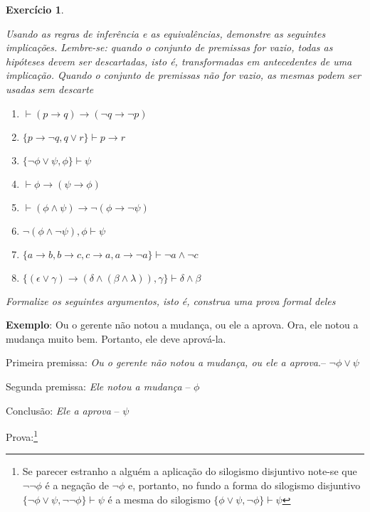 \documentclass[a4paper,10pt]{article}
\newtheorem{exrcc}{Exercício}[subsection] %
\begin{document}
\begin{exrcc}
 \label{demformal}


Usando as regras de inferência e as equivalências, demonstre as seguintes
implicações. Lembre-se: quando o conjunto de premissas for vazio, todas as hipóteses
devem ser descartadas, isto é, transformadas em antecedentes de uma implicação. Quando
o conjunto de premissas não for vazio, as mesmas podem ser usadas sem descarte

\begin{enumerate}
\setlength{\itemsep}{0pt} 
\item $\vdash(p\rightarrow{}q)\rightarrow(\neg{}q\rightarrow\neg{}p)$
 \item $\{p\rightarrow\neg{}q,{}q\vee{}r\}\vdash{}p\rightarrow{}r$
 \item $\{\neg\phi\vee\psi, \phi\}\vdash{}\psi$
 \item $\vdash\phi\rightarrow(\psi\rightarrow\phi)$
 \item $\vdash(\phi\wedge\psi)\rightarrow\neg(\phi\rightarrow\neg\psi)$
 \item $\neg(\phi\wedge\neg\psi), \phi\vdash\psi$
 \item $\{a\rightarrow{}b, b\rightarrow{}c, c\rightarrow{}a,
a\rightarrow{}\neg{}a\}\vdash\neg{}a\wedge\neg{}c$
\item $\{(\epsilon\vee\gamma)\rightarrow(\delta\wedge(\beta\wedge\lambda)),
\gamma\}\vdash\delta\wedge\beta$
\end{enumerate}
\end{exrcc}




\emph{Formalize os seguintes argumentos, isto é, construa uma prova formal deles}

\textbf{Exemplo}: Ou o gerente não notou  a mudança, ou ele a aprova. Ora, ele notou a
mudança muito bem. Portanto, ele deve aprová-la.

Primeira premissa: \textit{Ou o gerente não notou  a mudança, ou ele a aprova}.--
$\neg\phi\vee\psi$

Segunda premissa: \textit{Ele notou a mudança} -- $\phi$

Conclusão: \textit{Ele a aprova} -- $\psi$

Prova:\footnote{Se parecer estranho a alguém a aplicação do silogismo disjuntivo
note-se que $\neg\neg\phi$ é a negação de $\neg\phi$ e, portanto, no fundo a forma do
silogismo disjuntivo $\{\neg\phi\vee\psi,\neg\neg\phi\}\vdash\psi$ é a mesma do
silogismo $\{\phi\vee\psi,\neg\phi\}\vdash\psi$}
\end{document}
